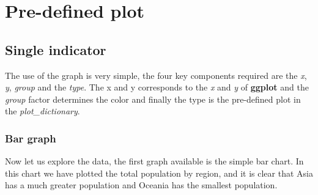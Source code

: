 \documentclass{article}\usepackage{graphicx, color}
\begin{document}
\section{Pre-defined plot}

\subsection{Single indicator}
The use of the graph is very simple, the four key components required
are the \textit{x}, \textit{y}, \textit{group} and the
\textit{type}. The x and y corresponds to the \textit{x} and
\textit{y} of \textbf{ggplot} and the \textit{group} factor determines
the color and finally the type is the pre-defined plot in the
\textit{plot\_dictionary}.


\subsubsection{Bar graph}
Now let us explore the data, the first graph available is the simple
bar chart. In this chart we have plotted the total population by
region, and it is clear that Asia has a much greater population and
Oceania has the smallest population.
\end{document}

